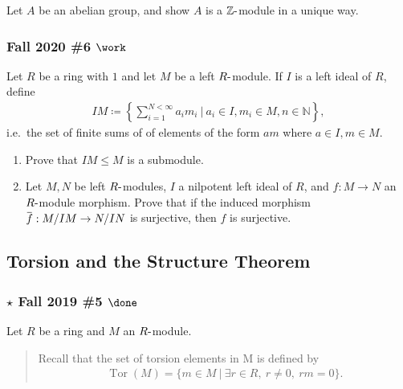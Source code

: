 Let \(A\) be an abelian group, and show \(A\) is a
\({\mathbb{Z}}{\hbox{-}}\)module in a unique way.

\hypertarget{fall-2020-6-work}{%
\subsubsection{\texorpdfstring{Fall 2020 \#6
\(\work\)}{Fall 2020 \#6 \textbackslash work}}\label{fall-2020-6-work}}

Let \(R\) be a ring with \(1\) and let \(M\) be a left
\(R{\hbox{-}}\)module. If \(I\) is a left ideal of \(R\), define
\begin{align*}
IM \coloneqq\left\{{ \sum_{i=1}^{N < \infty} a_i m_i {~\mathrel{\Big|}~}a_i \in I, m_i \in M, n\in {\mathbb{N}}}\right\}
,\end{align*}
i.e.~the set of finite sums of of elements of the form \(am\) where
\(a\in I, m\in M\).

\begin{enumerate}
\def\labelenumi{\alph{enumi}.}
\item
  Prove that \(IM \leq M\) is a submodule.
\item
  Let \(M, N\) be left \(R{\hbox{-}}\)modules, \(I\) a nilpotent left
  ideal of \(R\), and \(f: M\to N\) an \(R{\hbox{-}}\)module morphism.
  Prove that if the induced morphism
  \(\mkern 1.5mu\overline{\mkern-1.5muf\mkern-1.5mu}\mkern 1.5mu: M/IM \to N/IN\)
  is surjective, then \(f\) is surjective.
\end{enumerate}

\hypertarget{torsion-and-the-structure-theorem}{%
\subsection{Torsion and the Structure
Theorem}\label{torsion-and-the-structure-theorem}}

\hypertarget{star-fall-2019-5-done}{%
\subsubsection{\texorpdfstring{\(\star\) Fall 2019 \#5
\(\done\)}{\textbackslash star Fall 2019 \#5 \textbackslash done}}\label{star-fall-2019-5-done}}

Let \(R\) be a ring and \(M\) an \(R{\hbox{-}}\)module.

\begin{quote}
Recall that the set of torsion elements in M is defined by
\begin{align*}
\operatorname{Tor}(M) = \{m \in M {~\mathrel{\Big|}~}\exists r \in R, ~r \neq 0, ~rm = 0\}
.\end{align*}
\end{quote}

